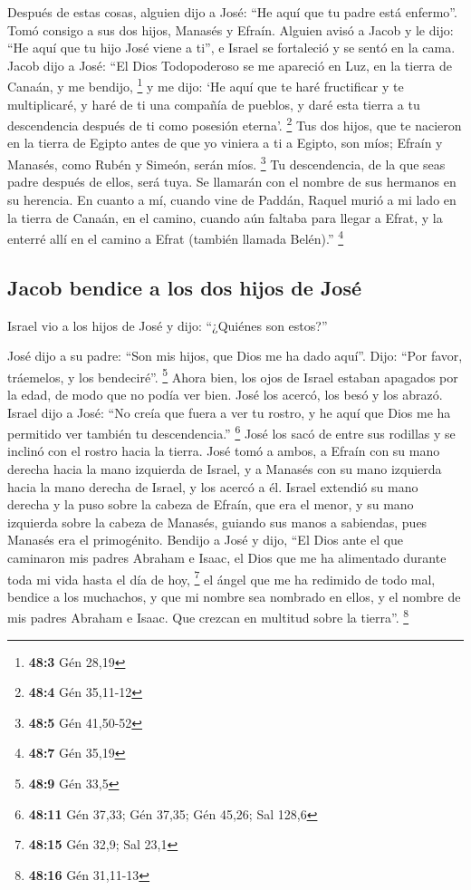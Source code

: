 \begin{paracol}{2}
 Después de estas cosas, alguien dijo a José: ``He aquí
que tu padre está enfermo''. Tomó consigo a sus dos hijos, Manasés y
Efraín.  Alguien avisó a Jacob y le dijo: ``He aquí que tu
hijo José viene a ti'', e Israel se fortaleció y se sentó en la cama.
 Jacob dijo a José: ``El Dios Todopoderoso se me apareció
en Luz, en la tierra de Canaán, y me bendijo, \footnote{\textbf{48:3}
  Gén 28,19}  y me dijo: `He aquí que te haré fructificar
y te multiplicaré, y haré de ti una compañía de pueblos, y daré esta
tierra a tu descendencia después de ti como posesión eterna'.
\footnote{\textbf{48:4} Gén 35,11-12}  Tus dos hijos, que
te nacieron en la tierra de Egipto antes de que yo viniera a ti a
Egipto, son míos; Efraín y Manasés, como Rubén y Simeón, serán míos.
\footnote{\textbf{48:5} Gén 41,50-52}  Tu descendencia, de
la que seas padre después de ellos, será tuya. Se llamarán con el nombre
de sus hermanos en su herencia.  En cuanto a mí, cuando
vine de Paddán, Raquel murió a mi lado en la tierra de Canaán, en el
camino, cuando aún faltaba para llegar a Efrat, y la enterré allí en el
camino a Efrat (también llamada Belén).'' \footnote{\textbf{48:7} Gén
  35,19}

\hypertarget{jacob-bendice-a-los-dos-hijos-de-josuxe9}{%
\subsection{Jacob bendice a los dos hijos de
José}\label{jacob-bendice-a-los-dos-hijos-de-josuxe9}}

 Israel vio a los hijos de José y dijo: ``¿Quiénes son
estos?''

 José dijo a su padre: ``Son mis hijos, que Dios me ha
dado aquí''. Dijo: ``Por favor, tráemelos, y los bendeciré''.
\footnote{\textbf{48:9} Gén 33,5}  Ahora bien, los ojos
de Israel estaban apagados por la edad, de modo que no podía ver bien.
José los acercó, los besó y los abrazó.  Israel dijo a
José: ``No creía que fuera a ver tu rostro, y he aquí que Dios me ha
permitido ver también tu descendencia.'' \footnote{\textbf{48:11} Gén
  37,33; Gén 37,35; Gén 45,26; Sal 128,6}  José los sacó
de entre sus rodillas y se inclinó con el rostro hacia la tierra.
 José tomó a ambos, a Efraín con su mano derecha hacia la
mano izquierda de Israel, y a Manasés con su mano izquierda hacia la
mano derecha de Israel, y los acercó a él.  Israel
extendió su mano derecha y la puso sobre la cabeza de Efraín, que era el
menor, y su mano izquierda sobre la cabeza de Manasés, guiando sus manos
a sabiendas, pues Manasés era el primogénito.  Bendijo a
José y dijo, ``El Dios ante el que caminaron mis padres Abraham e Isaac,
el Dios que me ha alimentado durante toda mi vida hasta el día de hoy,
\footnote{\textbf{48:15} Gén 32,9; Sal 23,1}  el ángel
que me ha redimido de todo mal, bendice a los muchachos, y que mi nombre
sea nombrado en ellos, y el nombre de mis padres Abraham e Isaac. Que
crezcan en multitud sobre la tierra''. \footnote{\textbf{48:16} Gén
  31,11-13}


\end{paracol}
